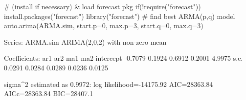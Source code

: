 \begin{Schunk}
\begin{Sinput}
 # (install if necessary) & load forecast pkg
 if(!require("forecast")) {
     install.packages("forecast")
     library("forecast")
 }
 # find best ARMA(p,q) model
 auto.arima(ARMA.sim, start.p=0, max.p=3, start.q=0, max.q=3)
\end{Sinput}
\begin{Soutput}
Series: ARMA.sim 
ARIMA(2,0,2) with non-zero mean 

Coefficients:
          ar1     ar2     ma1     ma2  intercept
      -0.7079  0.1924  0.6912  0.2001     4.9975
s.e.   0.0291  0.0284  0.0289  0.0236     0.0125

sigma^2 estimated as 0.9972:  log likelihood=-14175.92
AIC=28363.84   AICc=28363.84   BIC=28407.1
\end{Soutput}
\end{Schunk}
